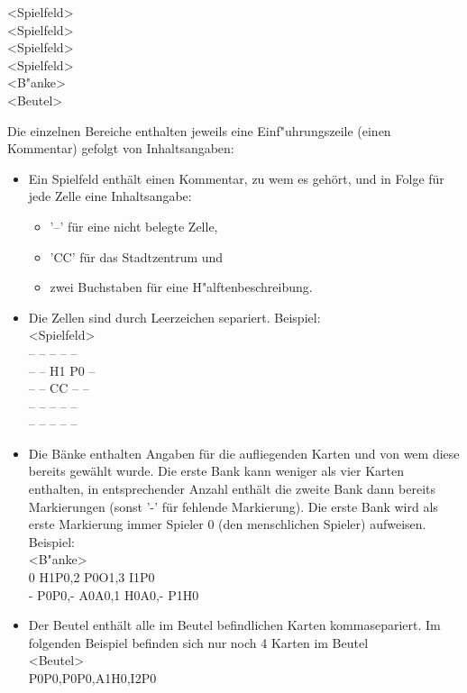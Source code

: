 \begin{addmargin}[50pt]{0pt}
<Spielfeld>
\\<Spielfeld>
\\<Spielfeld>
\\<Spielfeld>
\\<B"anke>
\\<Beutel>\\
\end{addmargin}

Die einzelnen Bereiche enthalten jeweils eine Einf"uhrungszeile (einen Kommentar) gefolgt von Inhaltsangaben:
\begin{itemize}
	\item Ein Spielfeld enthält einen Kommentar, zu wem es gehört, und in Folge für jede Zelle eine Inhaltsangabe:
	\begin{itemize}
		\item '--' für eine nicht belegte Zelle,
		\item 'CC' für das Stadtzentrum und
		\item zwei Buchstaben für eine H"alftenbeschreibung.
	\end{itemize}
	\item Die Zellen sind durch Leerzeichen separiert. Beispiel:
	\\ <Spielfeld>
	\\-- -- -- -- --
	\\-- -- H1 P0 --
	\\-- -- CC -- --
	\\-- -- -- -- --
	\\-- -- -- -- --
	\item Die Bänke enthalten Angaben für die aufliegenden Karten und von wem diese bereits gewählt wurde. Die erste Bank kann weniger als vier Karten enthalten, in entsprechender Anzahl enthält die zweite Bank dann bereits Markierungen (sonst '-' für fehlende Markierung). Die erste Bank wird als erste Markierung immer Spieler 0 (den menschlichen Spieler) aufweisen. Beispiel:
	\\<B"anke>
  \\0 H1P0,2 P0O1,3 I1P0
  \\- P0P0,- A0A0,1 H0A0,- P1H0
  \item Der Beutel enthält alle im Beutel befindlichen Karten kommasepariert. Im folgenden Beispiel befinden sich nur noch 4 Karten im Beutel
  \\<Beutel>
  \\P0P0,P0P0,A1H0,I2P0
\end{itemize}

